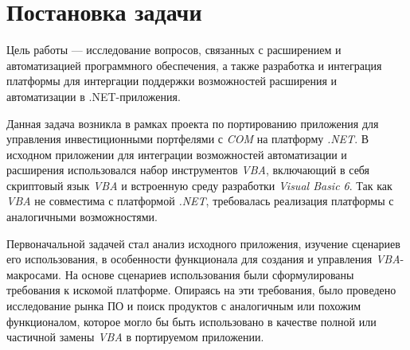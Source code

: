 \section{Постановка задачи}

Цель работы --- исследование вопросов, связанных с расширением и автоматизацией программного обеспечения, а также разработка и интеграция платформы для интергации поддержки возможностей расширения и автоматизации в .NET-приложения.

Данная задача возникла в рамках проекта по портированию приложения для управления инвестиционными портфелями с {\it COM} на платформу {\it .NET}. В исходном приложении для интеграции возможностей автоматизации и расширения использовался набор инструментов {\it VBA}, включающий в себя скриптовый язык {\it VBA} и встроенную среду разработки {\it Visual Basic 6}. Так как {\it VBA} не совместима с платформой {\it .NET}, требовалась реализация платформы с аналогичными возможностями. 

Первоначальной задачей стал анализ исходного приложения, изучение сценариев его использования, в особенности функционала для создания и управления {\it VBA}-макросами. На основе сценариев использования были сформулированы требования к искомой платформе. Опираясь на эти требования, было проведено исследование рынка ПО и поиск продуктов с аналогичным или похожим функционалом, которое могло бы быть использовано в качестве полной или частичной замены {\it VBA} в портируемом приложении.

\pagebreak